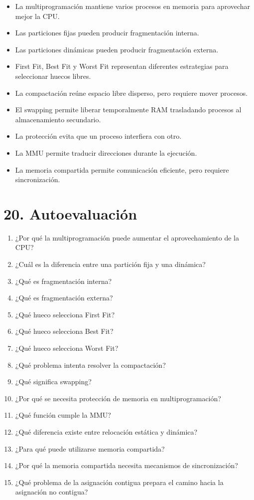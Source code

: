 \documentclass[
  spanish,
  letterpaper,
]{scrbook}
\providecommand{\tightlist}{%
  \setlength{\itemsep}{0pt}\setlength{\parskip}{0pt}}
\begin{document}
\begin{itemize}
\tightlist
\item
  La multiprogramación mantiene varios procesos en memoria para
  aprovechar mejor la CPU.
\item
  Las particiones fijas pueden producir fragmentación interna.
\item
  Las particiones dinámicas pueden producir fragmentación externa.
\item
  First Fit, Best Fit y Worst Fit representan diferentes estrategias
  para seleccionar huecos libres.
\item
  La compactación reúne espacio libre disperso, pero requiere mover
  procesos.
\item
  El swapping permite liberar temporalmente RAM trasladando procesos al
  almacenamiento secundario.
\item
  La protección evita que un proceso interfiera con otro.
\item
  La MMU permite traducir direcciones durante la ejecución.
\item
  La memoria compartida permite comunicación eficiente, pero requiere
  sincronización.
\end{itemize}

\section{20. Autoevaluación}\label{autoevaluaciuxf3n-12}

\begin{enumerate}
\def\labelenumi{\arabic{enumi}.}
\tightlist
\item
  ¿Por qué la multiprogramación puede aumentar el aprovechamiento de la
  CPU?
\item
  ¿Cuál es la diferencia entre una partición fija y una dinámica?
\item
  ¿Qué es fragmentación interna?
\item
  ¿Qué es fragmentación externa?
\item
  ¿Qué hueco selecciona First Fit?
\item
  ¿Qué hueco selecciona Best Fit?
\item
  ¿Qué hueco selecciona Worst Fit?
\item
  ¿Qué problema intenta resolver la compactación?
\item
  ¿Qué significa swapping?
\item
  ¿Por qué se necesita protección de memoria en multiprogramación?
\item
  ¿Qué función cumple la MMU?
\item
  ¿Qué diferencia existe entre relocación estática y dinámica?
\item
  ¿Para qué puede utilizarse memoria compartida?
\item
  ¿Por qué la memoria compartida necesita mecanismos de sincronización?
\item
  ¿Qué problema de la asignación contigua prepara el camino hacia la
  asignación no contigua?
\end{enumerate}
\end{document}
